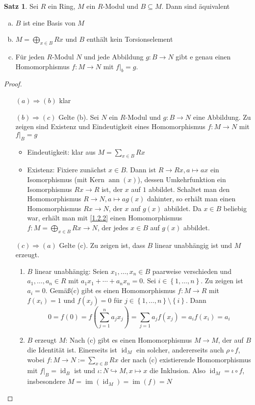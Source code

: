 \documentclass[
twoside=semi,
fontsize=12,
DIV=12, 
cleardoublepage=current,
leqno,
headings=optiontoheadandtoc, 
toc=idx
]{scrbook}
\newcommand{\brac}[1]{\left( #1 \right)}
\newcommand{\set}[1]{\left\{ #1 \right\}}
\DeclareMathOperator{\im}{im}
\DeclareMathOperator{\ann}{ann}
\DeclareMathOperator{\id}{id}
\theoremstyle{definition}
\newtheorem{satz}[definition]{Satz}
\begin{document}
	\begin{satz}\label{1.2.5}
		Sei $R$ ein Ring, $M$ ein $R$-Modul und $B \subseteq M$. Dann sind \"aquivalent
		\begin{enumerate}[(a)]
			\item $B$ ist eine Basis von $M$
			\item $M = \bigoplus_{x \in B} Rx$ und $B$ enth\"alt kein Torsionselement
			\item F\"ur jeden $R$-Modul $N$ und jede Abbildung $g:B \to N$ gibt e genau einen Homomorphismus $f:M \to N$ mit $f\big|_b = g$.
		\end{enumerate}
	
		\begin{proof}\hfill
			\begin{enumerate}
				\item[$(a) \Rightarrow (b)$] klar
				\item[$(b) \Rightarrow (c)$] Gelte (b). Sei $N$ ein $R$-Modul und $g:B \to N$ eine Abbildung. Zu zeigen sind Existenz und Eindeutigkeit eines Homomorphismus $f: M \to N$ mit $f\big|_B = g$
					\begin{itemize}
						\item Eindeutigkeit: klar aus $M = \sum_{x \in B} Rx$
						\item Existenz: Fixiere zun\"achst $x \in B$. Dann ist $R \to Rx, a \mapsto ax$ ein Isomorphismus (mit Kern $\ann(x)$), dessen Umkehrfunktion ein Isomorphismus $Rx \to R$ ist, der $x$ auf $1$ abbildet. Schaltet man den Homomorphismus $R \to N, a \mapsto ag(x)$ dahinter, so erh\"alt man einen Homomorphismus $Rx \to N$, der $x$ auf $g(x)$ abbildet. Da $x \in B$ beliebig war, erh\"alt man mit \ref{1.2.2} einen Homomorphismus $f: M = \bigoplus_{x \in B} Rx \to N$, der jedes $x \in B$ auf $g(x)$ abbildet.  
					\end{itemize}
				\item[$(c) \Rightarrow (a)$] Gelte (c). Zu zeigen ist, dass $B$ linear unabh\"angig ist und $M$ erzeugt.
				\begin{enumerate}[1.]
					\item $B$ linear unabh\"angig: Seien $x_1, \dots, x_n \in B$ paarweise verschieden und $a_1, \dots, a_n \in R$ mit $a_1x_1 + \cdots + a_nx_n = 0$. Sei $i \in \set{1, \dots, n}$. Zu zeigen ist $a_i = 0$. Gem\"a\ss (c) gibt es einen Homomorphismus $f: M \to R$ mit $f(x_i) = 1$ und $f(x_j) = 0$ f\"ur $j \in \set{1, \dots, n} \setminus \set{i}$.
					Dann \[0 = f(0) = f\brac{\sum_{j=1}^n a_jx_j} = \sum_{j=1}a_jf(x_j) = a_if(x_i) = a_i\]
					
					\item $B$ erzeugt $M$: Nach (c) gibt es einen Homomorphismus $M \to M$, der auf $B$ die Identit\"at ist. Einerseits ist $\id_M$ ein solcher, andererseits auch $\rho \circ f$, wobei $f: M \to N:= \sum_{x \in B} Rx$ der nach (c) existierende Homomorphismus mit $f\big|_{B} = \id_B$ ist und $\iota: N \hookrightarrow M, x \mapsto x$ die Inklusion. Also $\id_M = \iota \circ f$, insbesondere $M = \im(\id_M) = \im(f) = N$
				\end{enumerate}
 			\end{enumerate}
		\end{proof}
	\end{satz}
\end{document}
